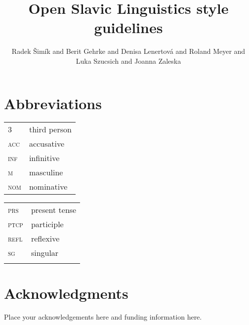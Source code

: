 \documentclass[output=paper,colorlinks,citecolor=brown]{langscibook}
\author{Radek Šimík\orcid{0000-0002-4736-195X}\affiliation{Charles University} and Berit Gehrke\orcid{0000-0002-6315-9532}\affiliation{Humboldt-Universität zu Berlin} and Denisa Lenertová\orcid{}\affiliation{Humboldt-Universität zu Berlin} and Roland Meyer\orcid{0000-0003-2023-0527}\affiliation{Humboldt-Universität zu Berlin} and Luka Szucsich\orcid{}\affiliation{Humboldt-Universität zu Berlin} and Joanna Zaleska\orcid{0000-0002-0059-6938}\affiliation{Humboldt-Universität zu Berlin}}
\title{Open Slavic Linguistics style guidelines}
\begin{document}
\maketitle
 


\section*{Abbreviations}

\begin{tabularx}{.5\textwidth}{@{}lQ}
\textsc{3}&third person\\
\textsc{acc}&accusative\\
\textsc{inf}&infinitive\\
\textsc{m}&masculine\\
\textsc{nom}&nominative\\
\end{tabularx}%
\begin{tabularx}{.5\textwidth}{lQ@{}}
\textsc{prs}&present tense\\
\textsc{ptcp}&participle\\
\textsc{refl}&reflexive\\
\textsc{sg}&singular\\
&\\ %
\end{tabularx}

\section*{Acknowledgments}
Place your acknowledgements here and funding information here.

\printbibliography[heading=subbibliography,notkeyword=this]
\end{document}
